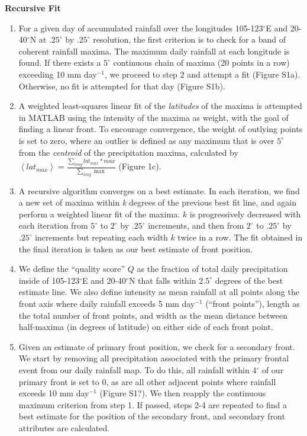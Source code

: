 \documentclass[draft,grl]{agutexSI}
\begin{document}
\begin{article}
\noindent\textbf{Recursive Fit}

\begin{enumerate}
	\item For a given day of accumulated rainfall over the longitudes 105-123$^{\circ}$E and 20-40$^{\circ}$N at $.25^{\circ}$ by $.25^{\circ}$ resolution, the first criterion is to check for a band of coherent rainfall maxima. The maximum daily rainfall at each longitude is found. If there exists a $5^{\circ}$ continuous chain of maxima (20 points in a row) exceeding 10 mm day$^{-1}$, we proceed to step 2 and attempt a fit (Figure S1a). Otherwise, no fit is attempted for that day (Figure S1b).
	
	\item A weighted least-squares linear fit of the \textit{latitudes} of the maxima is attempted in MATLAB using the intensity of the maxima as weight, with the goal of finding a linear front. To encourage convergence, the weight of outlying points is set to zero, where an outlier is defined as any maximum that is over $5^{\circ}$ from the \textit{centroid} of the precipitation maxima, calculated by $\left<lat_{max}\right>=\frac{\sum_{long} lat_{max}*max}{\sum_{long} \max}$ (Figure 1c). 
	
	\item A recursive algorithm converges on a best estimate. In each iteration, we find a new set of maxima within \textit{k} degrees of the previous best fit line, and again perform a weighted linear fit of the maxima. $k$ is progressively decreased with each iteration from $5^{\circ}$ to $2^{\circ}$ by $.25^{\circ}$ increments, and then from $2^{\circ}$ to $.25^{\circ}$ by $.25^{\circ}$ increments but repeating each width $k$ twice in a row. The fit obtained in the final iteration is taken as our best estimate of front position.
	
	\item We define the ``quality score'' $Q$ as the fraction of total daily precipitation inside of 105-123$^{\circ}$E and 20-40$^{\circ}$N that falls within $2.5^{\circ}$ degrees of the best estimate line. We also define intensity as mean rainfall at all points along the front axis where daily rainfall exceeds 5 mm day$^{-1}$ (``front points''), length as the total number of front points, and width as the mean distance between half-maxima (in degrees of latitude) on either side of each front point.
	
	\item Given an estimate of primary front position, we check for a secondary front. We start by removing all precipitation associated with the primary frontal event from our daily rainfall map. To do this, all rainfall within 4$^{\circ}$ of our primary front is set to 0, as are all other adjacent points where rainfall exceeds 10 mm day$^{-1}$ (Figure S1?). We then reapply the continuous maximum criterion from step 1. If passed, steps 2-4 are repeated to find a best estimate for the position of the secondary front, and secondary front attributes are calculated.
	

\end{enumerate}
\end{article}
\end{document}

